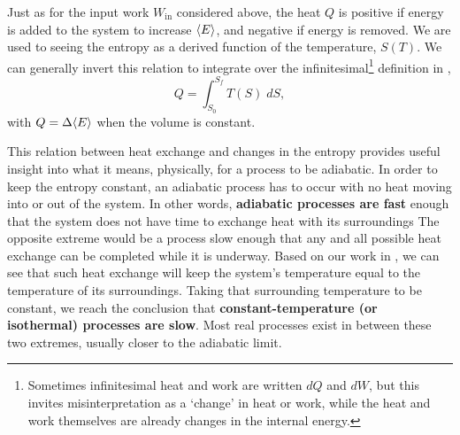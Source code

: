 Just as for the input work $W_{\text{in}}$ considered above, the heat $Q$ is positive if energy is added to the system to increase $\left\langle E \right\rangle$, and negative if energy is removed.
We are used to seeing the entropy as a derived function of the temperature, $S(T)$.
We can generally invert this relation to integrate over the infinitesimal\footnote{Sometimes infinitesimal heat and work are written $dQ$ and $dW$, but this invites misinterpretation as a `change' in heat or work, while the heat and work themselves are already changes in the internal energy.} definition in ,
\begin{equation}
  \label{eq:heat}
  Q = \int_{S_0}^{S_f} T(S) \; dS,
\end{equation}
with $Q = \Delta\!\left\langle E \right\rangle$ when the volume is constant.

This relation between heat exchange and changes in the entropy provides useful insight into what it means, physically, for a process to be adiabatic.
In order to keep the entropy constant, an adiabatic process has to occur with no heat moving into or out of the system.
In other words, \textbf{adiabatic processes are fast} enough that the system does not have time to exchange heat with its surroundings 
The opposite extreme would be a process slow enough that any and all possible heat exchange can be completed while it is underway.
Based on our work in , we can see that such heat exchange will keep the system's temperature equal to the temperature of its surroundings.
Taking that surrounding temperature to be constant, we reach the conclusion that \textbf{constant-temperature (or isothermal) processes are slow}.
Most real processes exist in between these two extremes, usually closer to the adiabatic limit.




